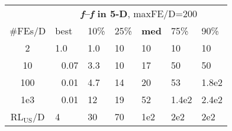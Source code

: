 \begin{tabular}{c|llllll}
 & \multicolumn{6}{|c}{\textbf{\textit{f}\raisebox{-0.35ex}{1}--\textit{f}\raisebox{-0.35ex}{24} in 5-D}, maxFE/D=200}\\
\#FEs/D & best & 10\% & 25\% & \textbf{med} & 75\% & 90\%\\
2 & \hspace*{1ex}1.0 & \hspace*{1ex}1.0 & 10 & 10 & 10 & 10\\
10 & ~\,0.07 & \hspace*{1ex}3.3 & 10 & 17 & 50 & 50\\
100 & ~\,0.01 & \hspace*{1ex}4.7 & 14 & 20 & 53 & 1.8e2\\
1e3 & ~\,0.01 & 12 & 19 & 52 & 1.4e2 & 2.4e2\\
$\text{RL}_{\text{US}}$/D & 4 & 30 & 70 & 1e2 & 2e2 & 2e2
\end{tabular}
